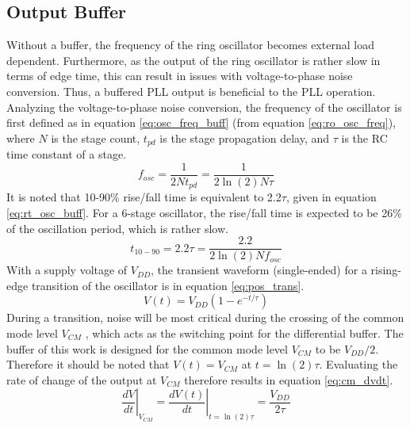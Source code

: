 
	\FloatBarrier
	\vspace{-2em}
	\subsection{Output Buffer}\label{sec:buffer}
		Without a buffer, the frequency of the ring oscillator becomes external load dependent. Furthermore, as the output of the ring oscillator is rather slow in terms of edge time, this can result in issues with voltage-to-phase noise conversion. Thus, a buffered PLL output is beneficial to the PLL operation. Analyzing the voltage-to-phase noise conversion, the frequency of the oscillator is first defined as in equation \ref{eq:osc_freq_buff} (from equation \ref{eq:ro_osc_freq}), where $N$ is the stage count, $t_{pd}$ is the stage propagation delay, and $\tau$ is the RC time constant of a stage. 
		\begin{equation}\label{eq:osc_freq_buff}
			f_{osc} = \frac{1}{2N t_{pd}} = \frac{1}{2\ln(2)N \tau}
		\end{equation}
		It is noted that 10-90\% rise/fall time is equivalent to 2.2$\tau$, given in equation \ref{eq:rt_osc_buff}. For a 6-stage oscillator, the rise/fall time is expected to be 26\% of the oscillation period, which is rather slow.
		\begin{equation}\label{eq:rt_osc_buff}
			t_{10-90} = 2.2\tau =  \frac{2.2}{2\ln(2)N f_{osc}}
		\end{equation}		
		With a supply voltage of $V_{DD}$, the transient waveform (single-ended) for a rising-edge transition of the oscillator is in equation \ref{eq:pos_trans}.
		\begin{equation}\label{eq:pos_trans}
			V(t) =V_{DD}\left( 1 - e^{-t/\tau} \right)
		\end{equation}		
		During a transition, noise will be most critical during the crossing of the common mode level $V_{CM}$ , which acts as the switching point for the differential buffer. The buffer of this work is designed for the common mode level $V_{CM}$ to be $V_{DD}/2$. Therefore it should be noted that $V(t) = V_{CM}$ at $t = \ln(2)\tau$. Evaluating the rate of change of the output at $V_{CM}$ therefore results in equation \ref{eq:cm_dvdt}.
		\begin{equation}\label{eq:cm_dvdt}
			\left.\frac{dV}{dt}\right|_{V_{CM}} = \left.\frac{dV(t)}{dt}\right|_{t= \ln(2)\tau} = \frac{V_{DD}}{2\tau}
		\end{equation}	
